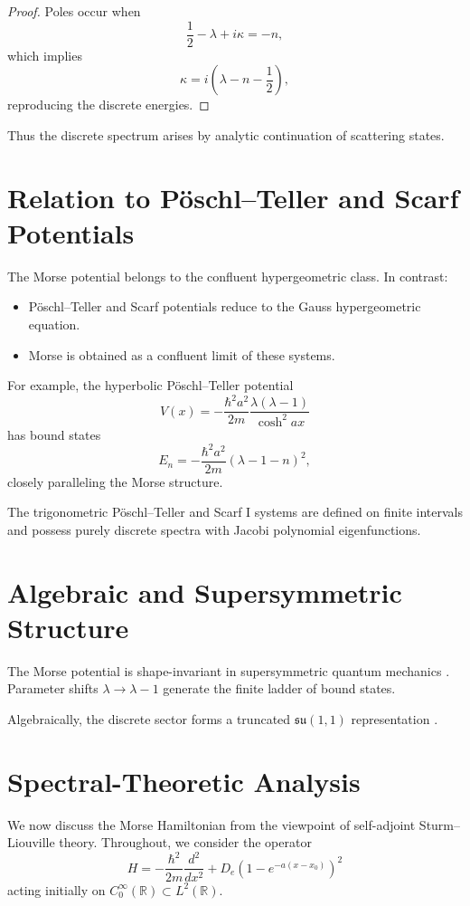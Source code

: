 \documentclass[11pt]{article}
\begin{document}
\begin{proof}
Poles occur when
\[
\frac12-\lambda+i\kappa=-n,
\]
which implies
\[
\kappa=i\left(\lambda-n-\frac12\right),
\]
reproducing the discrete energies.
\end{proof}

Thus the discrete spectrum arises by analytic continuation of
scattering states.

\section{Relation to P\"oschl--Teller and Scarf Potentials}

The Morse potential belongs to the confluent hypergeometric class.
In contrast:

\begin{itemize}
\item P\"oschl--Teller and Scarf potentials reduce to the Gauss hypergeometric equation.
\item Morse is obtained as a confluent limit of these systems.
\end{itemize}

For example, the hyperbolic P\"oschl--Teller potential
\[
V(x)=-\frac{\hbar^2 a^2}{2m}
\frac{\lambda(\lambda-1)}{\cosh^2 ax}
\]
has bound states
\[
E_n=-\frac{\hbar^2 a^2}{2m}(\lambda-1-n)^2,
\]
closely paralleling the Morse structure.

The trigonometric P\"oschl--Teller and Scarf I systems are defined
on finite intervals and possess purely discrete spectra with
Jacobi polynomial eigenfunctions.

\section{Algebraic and Supersymmetric Structure}

The Morse potential is shape-invariant in supersymmetric
quantum mechanics \cite{cooper-khare-sukhatme}.
Parameter shifts $\lambda\to\lambda-1$ generate the finite ladder
of bound states.

Algebraically, the discrete sector forms a truncated
$\mathfrak{su}(1,1)$ representation
\cite{barut-girardello}.

\section{Spectral-Theoretic Analysis}

We now discuss the Morse Hamiltonian from the viewpoint of
self-adjoint Sturm--Liouville theory. Throughout, we consider the
operator
\begin{equation}
H=-\frac{\hbar^2}{2m}\frac{d^2}{dx^2}
+D_e\left(1-e^{-a(x-x_0)}\right)^2
\end{equation}
acting initially on $C_0^\infty(\mathbb{R})\subset L^2(\mathbb{R})$.
\end{document}
